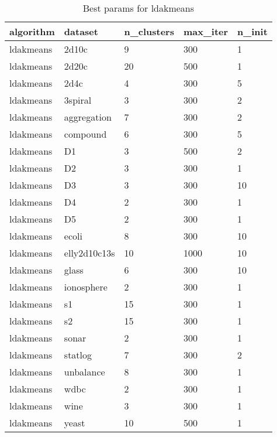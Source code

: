 \begin{table}[H]
\centering
\caption{Best params for ldakmeans}
\label{tab:params:ldakmeans}
\begin{tabular}{|l|l|l|l|l|}
\hline
algorithm & dataset & n\_clusters & max\_iter & n\_init \\
\hline
ldakmeans & 2d10c & 9 & 300 & 1 \\
\hline
ldakmeans & 2d20c & 20 & 500 & 1 \\
\hline
ldakmeans & 2d4c & 4 & 300 & 5 \\
\hline
ldakmeans & 3spiral & 3 & 300 & 2 \\
\hline
ldakmeans & aggregation & 7 & 300 & 2 \\
\hline
ldakmeans & compound & 6 & 300 & 5 \\
\hline
ldakmeans & D1 & 3 & 500 & 2 \\
\hline
ldakmeans & D2 & 3 & 300 & 1 \\
\hline
ldakmeans & D3 & 3 & 300 & 10 \\
\hline
ldakmeans & D4 & 2 & 300 & 1 \\
\hline
ldakmeans & D5 & 2 & 300 & 1 \\
\hline
ldakmeans & ecoli & 8 & 300 & 10 \\
\hline
ldakmeans & elly2d10c13s & 10 & 1000 & 10 \\
\hline
ldakmeans & glass & 6 & 300 & 10 \\
\hline
ldakmeans & ionosphere & 2 & 300 & 1 \\
\hline
ldakmeans & s1 & 15 & 300 & 1 \\
\hline
ldakmeans & s2 & 15 & 300 & 1 \\
\hline
ldakmeans & sonar & 2 & 300 & 1 \\
\hline
ldakmeans & statlog & 7 & 300 & 2 \\
\hline
ldakmeans & unbalance & 8 & 300 & 1 \\
\hline
ldakmeans & wdbc & 2 & 300 & 1 \\
\hline
ldakmeans & wine & 3 & 300 & 1 \\
\hline
ldakmeans & yeast & 10 & 500 & 1 \\
\hline
\end{tabular}
\end{table}
